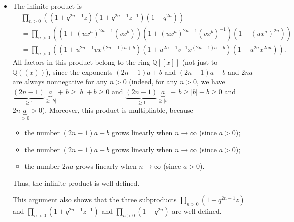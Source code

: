 \begin{itemize}
\item The infinite product is%
\begin{align*}
&  \prod_{n>0}\left(  \left(  1+q^{2n-1}z\right)  \left(  1+q^{2n-1}%
z^{-1}\right)  \left(  1-q^{2n}\right)  \right) \\
&  =\prod_{n>0}\left(  \left(  1+\left(  ux^{a}\right)  ^{2n-1}\left(
vx^{b}\right)  \right)  \left(  1+\left(  ux^{a}\right)  ^{2n-1}\left(
vx^{b}\right)  ^{-1}\right)  \left(  1-\left(  ux^{a}\right)  ^{2n}\right)
\right) \\
&  =\prod_{n>0}\left(  \left(  1+u^{2n-1}vx^{\left(  2n-1\right)  a+b}\right)
\left(  1+u^{2n-1}v^{-1}x^{\left(  2n-1\right)  a-b}\right)  \left(
1-u^{2n}x^{2na}\right)  \right)  .
\end{align*}
All factors in this product belong to the ring $\mathbb{Q}\left[  \left[
x\right]  \right]  $ (not just to $\mathbb{Q}\left(  \left(  x\right)
\right)  $), since the exponents $\left(  2n-1\right)  a+b$ and $\left(
2n-1\right)  a-b$ and $2na$ are always nonnegative for any $n>0$ (indeed, for
any $n>0$, we have $\underbrace{\left(  2n-1\right)  }_{\geq1}\underbrace{a}%
_{\geq\left\vert b\right\vert }+\,b\geq\left\vert b\right\vert +b\geq0$ and
$\underbrace{\left(  2n-1\right)  }_{\geq1}\underbrace{a}_{\geq\left\vert
b\right\vert }-\,b\geq\left\vert b\right\vert -b\geq0$ and $2n\underbrace{a}%
_{>0}>0$). Moreover, this product is multipliable, because

\begin{itemize}
\item the number $\left(  2n-1\right)  a+b$ grows linearly when $n\rightarrow
\infty$ (since $a>0$);

\item the number $\left(  2n-1\right)  a-b$ grows linearly when $n\rightarrow
\infty$ (since $a>0$);

\item the number $2na$ grows linearly when $n\rightarrow\infty$ (since $a>0$).
\end{itemize}

Thus, the infinite product is well-defined.

This argument also shows that the three subproducts $\prod_{n>0}\left(
1+q^{2n-1}z\right)  $ and $\prod_{n>0}\left(  1+q^{2n-1}z^{-1}\right)  $ and
$\prod_{n>0}\left(  1-q^{2n}\right)  $ are well-defined.


\end{itemize}
